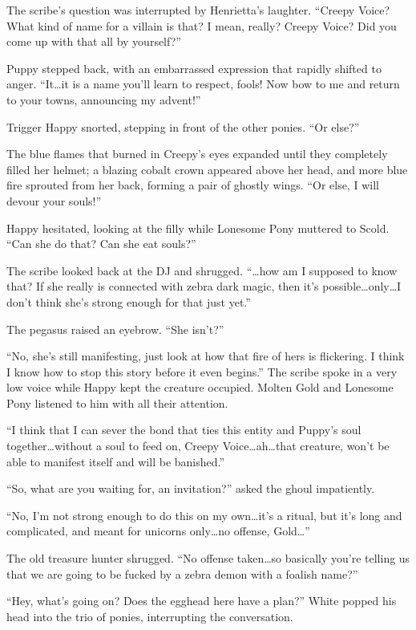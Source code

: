 The scribe's question was interrupted by Henrietta's laughter. ``Creepy Voice? What kind of name for a villain is that? I mean, really? Creepy Voice? Did you come up with that all by yourself?''

Puppy stepped back, with an embarrassed expression that rapidly shifted to anger. ``It\dots it is a name you'll learn to respect, fools! Now bow to me and return to your towns, announcing my advent!''

Trigger Happy snorted, stepping in front of the other ponies. ``Or else?''

The blue flames that burned in Creepy's eyes expanded until they completely filled her helmet; a blazing cobalt crown appeared above her head, and more blue fire sprouted from her back, forming a pair of ghostly wings. ``Or else, I will devour your souls!''

Happy hesitated, looking at the filly while Lonesome Pony muttered to Scold. ``Can she do that? Can she eat souls?''

The scribe looked back at the DJ and shrugged. ``\dots how am I supposed to know that? If she really is connected with zebra dark magic, then it's possible\dots only\dots I don't think she's strong enough for that just yet.''

The pegasus raised an eyebrow. ``She isn't?''

``No, she's still manifesting, just look at how that fire of hers is flickering. I think I know how to stop this story before it even begins.'' The scribe spoke in a very low voice while Happy kept the creature occupied. Molten Gold and Lonesome Pony listened to him with all their attention.

``I think that I can sever the bond that ties this entity and Puppy's soul together\dots without a soul to feed on, Creepy Voice\dots ah\dots that creature, won't be able to manifest itself and will be banished.''

``So, what are you waiting for, an invitation?'' asked the ghoul impatiently.

``No, I'm not strong enough to do this on my own\dots it's a ritual, but it's long and complicated, and meant for unicorns only\dots no offense, Gold\dots''

The old treasure hunter shrugged. ``No offense taken\dots so basically you're telling us that we are going to be fucked by a zebra demon with a foalish name?''

``Hey, what's going on? Does the egghead here have a plan?'' White popped his head into the trio of ponies, interrupting the conversation.

